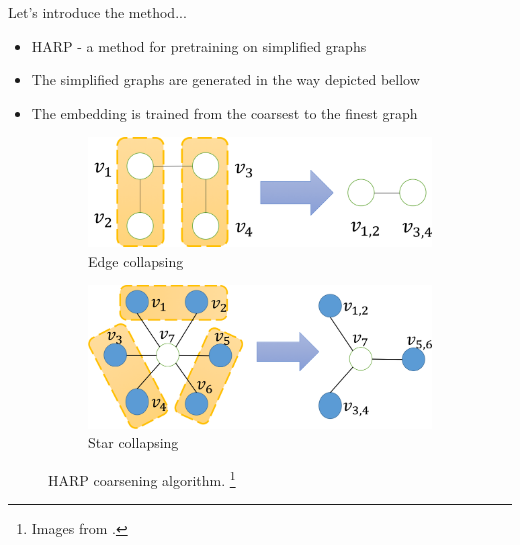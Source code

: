 \documentclass[10pt]{beamer}
\begin{document}
\begin{frame}{Let's introduce the method...}
	\begin{itemize}
		\item HARP - a method for pretraining on simplified graphs
		\item The simplified graphs are generated in the way depicted bellow
		\item The embedding is trained from the coarsest to the finest graph
	\end{itemize}
	\begin{figure}
		\centering
		\begin{subfigure}[t]{0.38\textwidth}
			\centering
			\includegraphics[width=\textwidth]{images/edge_collapsing.png}
			\caption{Edge collapsing}
		\end{subfigure}
		\hspace{2em}
		\begin{subfigure}[t]{0.38\textwidth}
			\centering
			\includegraphics[width=\textwidth]{images/star_collapsing.png}
			\caption{Star collapsing}
		\end{subfigure}
		\caption{HARP coarsening algorithm. \footnote{Images from \cite{chen_harp_2018}.}}
	\end{figure}
\end{frame}
\end{document}
